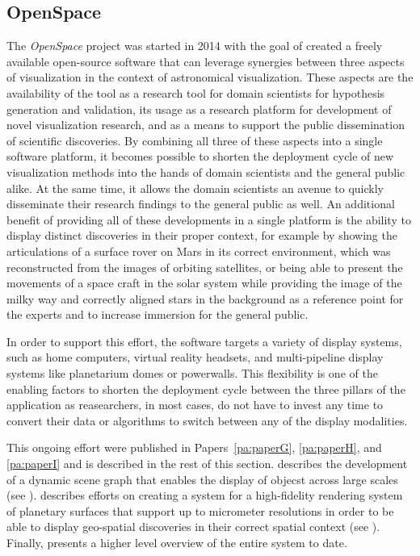 \subsection{OpenSpace} \label{contributions:astro:openspace}
The \emph{OpenSpace} project was started in 2014 with the goal of created a freely available open-source software that can leverage synergies between three aspects of visualization in the context of astronomical visualization.  These aspects are the availability of the tool as a research tool for domain scientists for hypothesis generation and validation, its usage as a research platform for development of novel visualization research, and as a means to support the public dissemination of scientific discoveries.  By combining all three of these aspects into a single software platform, it becomes possible to shorten the deployment cycle of new visualization methods into the hands of domain scientists and the general public alike.  At the same time, it allows the domain scientists an avenue to quickly disseminate their research findings to the general public as well.  An additional benefit of providing all of these developments in a single platform is the ability to display distinct discoveries in their proper context, for example by showing the articulations of a surface rover on Mars in its correct environment, which was reconstructed from the images of orbiting satellites, or being able to present the movements of a space craft in the solar system while providing the image of the milky way and correctly aligned stars in the background as a reference point for the experts and to  increase immersion for the general public.

In order to support this effort, the software targets a variety of display systems, such as home computers, virtual reality headsets, and multi-pipeline display systems like planetarium domes or powerwalls.  This flexibility is one of the enabling factors to shorten the deployment cycle between the three pillars of the application as reasearchers, in most cases, do not have to invest any time to convert their data or algorithms to switch between any of the display modalities.

This ongoing effort were published in Papers~\ref{pa:paperG}, \ref{pa:paperH}, and \ref{pa:paperI} and is described in the rest of this section.   describes the development of a dynamic scene graph that enables the display of objecst across large scales (see ).   describes efforts on creating a system for a high-fidelity rendering system of planetary surfaces that support up to micrometer resolutions in order to be able to display geo-spatial discoveries in their correct spatial context (see ).  Finally,  presents a higher level overview of the entire system to date.

